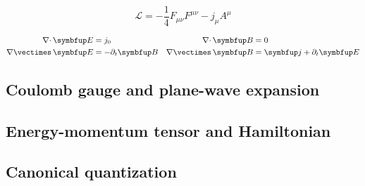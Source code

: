 \begin{equation}
	\mathcal{L}
	=
	-
	\frac{1}{4}
	F_{\mu\nu}
	F^{\mu\nu}
	-
	j_\mu A^\mu
\end{equation}

\begin{align}
	\div\vb{E}
	&=
	j_0
	&
	\div\vb{B}
	&=
	0
	\\
	\curl\vb{E}
	&=
	-\partial_t\vb{B}
	&
	\curl\vb{B}
	&=
	\vb{j}
	+
	\partial_t\vb{E}
\end{align}

\subsection{Coulomb gauge and plane-wave expansion}


\subsection{Energy-momentum tensor and Hamiltonian}

\subsection{Canonical quantization}

